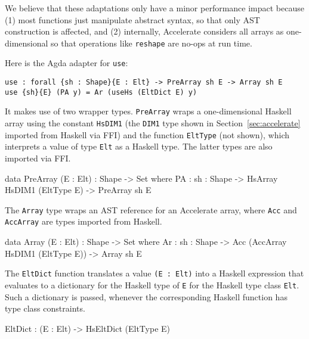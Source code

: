 \documentclass{llncs}
\begin{document}
We believe that these adaptations only have a minor performance impact
because (1) most functions just manipulate abstract syntax, so that
only AST construction is affected, and (2) internally, Accelerate
considers all arrays as one-dimensional so that operations like
\texttt{reshape} are no-ops at run time.

Here is the Agda adapter for \texttt{use}:
\begin{verbatim}
use : forall {sh : Shape}{E : Elt} -> PreArray sh E -> Array sh E
use {sh}{E} (PA y) = Ar (useHs (EltDict E) y)
\end{verbatim}
It makes use of two wrapper types. \texttt{PreArray} wraps a
one-dimensional Haskell array using the constant \texttt{HsDIM1} (the
\texttt{DIM1} type shown in Section~\ref{sec:accelerate} imported from
Haskell via FFI) and the function \texttt{EltType} (not shown), which
interprets a value of type \texttt{Elt} as a Haskell type. The
latter types are also imported via FFI.
\begin{code}
data PreArray (E : Elt) : Shape -> Set where
  PA : {sh : Shape} -> HsArray HsDIM1 (EltType E) -> PreArray sh E
\end{code}
The \texttt{Array} type wraps an AST reference for an Accelerate
array, where \texttt{Acc} and \texttt{AccArray} are types imported
from Haskell.
\begin{code}
data Array (E : Elt) : Shape -> Set where
  Ar : {sh : Shape} -> Acc (AccArray HsDIM1 (EltType E)) -> Array sh E
\end{code}
The \texttt{EltDict} function translates a value 
\texttt{(E : Elt)} into a Haskell expression that evaluates to a
dictionary for the Haskell type of \texttt{E} for the Haskell type
class \texttt{Elt}. Such a dictionary is passed, whenever the
corresponding Haskell function has type class constraints.
\begin{code}
EltDict : (E : Elt) -> HsEltDict (EltType E)
\end{code}
\end{document}
